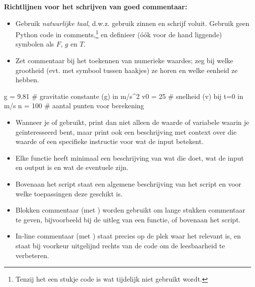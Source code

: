 \documentclass[a4paper,11pt, fleqn]{article}
\begin{document}
\textbf{Richtlijnen voor het schrijven van goed commentaar:}
\begin{itemize}
\item Gebruik \textit{natuurlijke taal}, d.w.z. gebruik zinnen en schrijf voluit. Gebruik geen Python code in comments,\footnote{Tenzij het een stukje code is wat tijdelijk niet gebruikt wordt.} en definieer (\'o\'ok voor de hand liggende) symbolen als $F$, $g$ en $T$.
\item Zet commentaar bij het toekennen van numerieke waardes; zeg bij welke grootheid (evt. met symbool tussen haakjes) ze horen en welke eenheid ze hebben.
\end{itemize}

	\begin{python}
	g = 9.81      # gravitatie constante (g) in m/s^2
	v0 = 25       # snelheid (v) bij t=0 in m/s
	n = 100       # aantal punten voor berekening
	\end{python}

\begin{itemize}
\item Wanneer je  of  gebruikt, print dan niet alleen de waarde of variabele waarin je ge\"interesseerd bent, maar print ook een beschrijving met context over die waarde of een specifieke instructie voor wat de input betekent.
\item Elke functie heeft minimaal een beschrijving van wat die doet, wat de input en output is en wat de eventuele  zijn.
\item Bovenaan het script staat een algemene beschrijving van het script en voor welke toepassingen deze geschikt is.
\item Blokken commentaar (met ) worden gebruikt om lange stukken commentaar te geven, bijvoorbeeld bij de uitleg van een functie, of bovenaan het script.
\item In-line commentaar (met ) staat precies op de plek waar het relevant is, en staat bij voorkeur uitgelijnd rechts van de code om de leesbaarheid te verbeteren.
\end{itemize}
\end{document}
